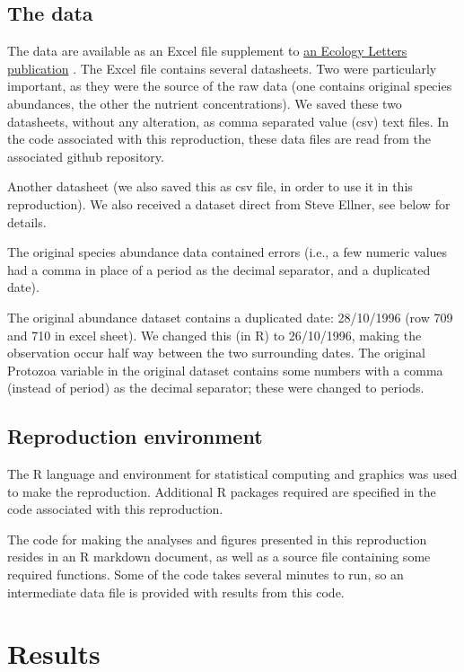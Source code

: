 \documentclass[10pt,a4paper,onecolumn]{article}
\begin{document}
\subsection{The data}\label{the-data}

The data are available as an Excel file supplement to
\href{http://onlinelibrary.wiley.com/doi/10.1111/j.1461-0248.2009.01391.x/abstract}{an
Ecology Letters publication} \textcite{Beninca2009}. The Excel file
contains several datasheets. Two were particularly important, as they
were the source of the raw data (one contains original species
abundances, the other the nutrient concentrations). We saved these two
datasheets, without any alteration, as comma separated value (csv) text
files. In the code associated with this reproduction, these data files
are read from the associated github repository.

Another datasheet (we also saved this as csv file, in order to use it in
this reproduction). We also received a dataset direct from Steve Ellner,
see below for details.

The original species abundance data contained errors (i.e., a few
numeric values had a comma in place of a period as the decimal
separator, and a duplicated date).

The original abundance dataset contains a duplicated date: 28/10/1996
(row 709 and 710 in excel sheet). We changed this (in R) to 26/10/1996,
making the observation occur half way between the two surrounding dates.
The original Protozoa variable in the original dataset contains some
numbers with a comma (instead of period) as the decimal separator; these
were changed to periods.

\subsection{Reproduction environment}\label{reproduction-environment}

The R language and environment for statistical computing and graphics
was used to make the reproduction. Additional R packages required are
specified in the code associated with this reproduction.

The code for making the analyses and figures presented in this
reproduction resides in an R markdown document, as well as a source file
containing some required functions. Some of the code takes several
minutes to run, so an intermediate data file is provided with results
from this code.

\section{Results}\label{results}
\end{document}
